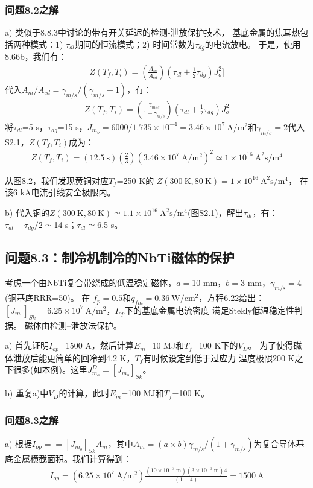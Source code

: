 \subsubsection{问题8.2之解}
a) 类似于8.8.3中讨论的带有开关延迟的检测-泄放保护技术，
基底金属的焦耳热包括两种模式：1) $\tau_{dl}$期间的恒流模式；2)
时间常数为$\tau_{dg}$的电流放电。
于是，使用8.66b，我们有：
\begin{align*}%
Z(T_f,T_i)=\left(\frac{A_m}{A_{cd}}\right)(\tau_{dl}+\frac{1}{2}\tau_{dg})J_{o}^{2} ]\tag{8.66b}
\end{align*}
代入$A_m/A_{cd}=\gamma_{m/s}/(\gamma_{m/s}+1)$，有：
\begin{align*}%
Z(T_f,T_i)=\left(\frac{\gamma_{m/s}}{1+\gamma_{m/s}}\right)(\tau_{dl}+\frac{1}{2}\tau_{dg})J_{o}^{2} \tag{S2.1}
\end{align*}
将$\tau_{dl}$=5 s，$\tau_{dg}$=15 s，$J_{m_o}=6000/1.735\times 10^{-4}=3.46\times 10^7\ \mathrm{ A/m^2}$和$\gamma_{m/s}=2$代入S2.1，$Z(T_f,T_i)$成为：
\begin{align*}%
Z(T_f,T_i)=(12.5\ \mathrm{s})\left(\frac{2}{3}\right)(3.46\times 10^7\ \mathrm{A/m^2})^2\simeq 1\times 10^{16}\ \mathrm{A^2s/m^4}
\end{align*}

从图8.2，我们发现黄铜对应$T_f$=250 K的
$Z(300\ \mathrm{K},80\ \mathrm{K})=1\times 10^{16}\ \mathrm{A^2 s/m^4}$，
在该6 kA电流引线安全极限内。

b) 代入铜的$Z(300\ \mathrm{K},80\ \mathrm{K})\simeq 1.1\times 10^{16}\ \mathrm{A^2 s/m^4}$(图S2.1)，解出$\tau_{dl}$，有：
$\tau_{dl}+\tau_{dg}/2\simeq$14 s；$\tau_{dl}\simeq$6.5 s。


\subsection{问题8.3：制冷机制冷的NbTi磁体的保护}
考虑一个由NbTi复合带绕成的低温稳定磁体，$a=$10 mm，$b=$3 mm，$\gamma_{m/s}=4$
(铜基底RRR=50)。
在 $f_p=0.5$和$q_{fm}=0.36\ \mathrm{W/cm^2}$，方程6.22给出：
$[J_{m_o}]_{Sk}=6.25\times 10^7\ \mathrm{ A/m^2}$，$I_{op}$下的基底金属电流密度
满足Stekly低温稳定性判据。
磁体由检测--泄放法保护。

a) 首先证明$I_{op}$=1500 A，然后计算$E_m$=10 MJ和$T_f$=100 K下的$V_D$。
为了使得磁体泄放后能更简单的回冷到4.2 K，$T_f$有时候设定到低于过应力
温度极限200 K之下很多(如本例)。这里$J_{m_o}^D=[J_{m_o}]_{Sk}$。

b) 重复a)中$V_D$的计算，此时$E_m$=100 MJ和$T_f$=100 K。

\subsubsection{问题8.3之解}
a) 根据$I_{op}==[J_{m_o}]_{Sk} A_m$，其中$A_m=(a\times b)\gamma_{m/s}/(1+\gamma_{m/s})$为复合导体基底金属横截面积。我们计算得到：
\begin{align*}%
I_{op}=(6.25\times 10^7\ \mathrm{A/m^2})\frac{(10\times 10^{-3}\ \mathrm{m})(3\times 10^{-3}\ \mathrm{m})4}{(1+4)}=1500\ \mathrm{A}
\end{align*}

